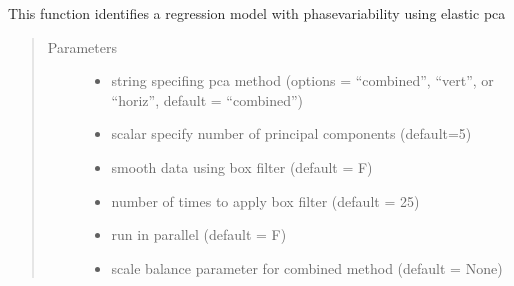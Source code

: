 \documentclass[letterpaper,10pt,english]{sphinxmanual}
\begin{document}
\begin{fulllineitems}
\begin{fulllineitems}
\label{\detokenize{pcr_regression:pcr_regression.elastic_pcr_regression.calc_model}}
This function identifies a regression model with phase\sphinxhyphen{}variability
using elastic pca
\begin{quote}\begin{description}
\item[{Parameters}] \leavevmode\begin{itemize}
\item {} 
 \textendash{} string specifing pca method (options = “combined”,
“vert”, or “horiz”, default = “combined”)

\item {} 
 \textendash{} scalar specify number of principal components (default=5)

\item {} 
 \textendash{} smooth data using box filter (default = F)

\item {} 
 \textendash{} number of times to apply box filter (default = 25)

\item {} 
 \textendash{} run in parallel (default = F)

\item {} 
 \textendash{} scale balance parameter for combined method (default = None)

\end{itemize}

\end{description}\end{quote}

\end{fulllineitems}


\end{fulllineitems}
\end{document}
